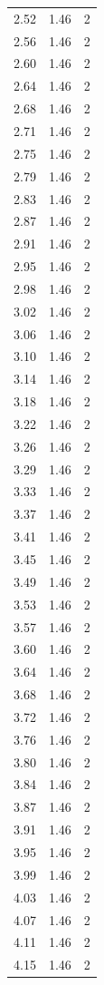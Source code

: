\begin{longtable}{lrr}
  2.52 & 1.46 & 2 \\
  2.56 & 1.46 & 2 \\
  2.60 & 1.46 & 2 \\
  2.64 & 1.46 & 2 \\
  2.68 & 1.46 & 2 \\
  2.71 & 1.46 & 2 \\
  2.75 & 1.46 & 2 \\
  2.79 & 1.46 & 2 \\
  2.83 & 1.46 & 2 \\
  2.87 & 1.46 & 2 \\
  2.91 & 1.46 & 2 \\
  2.95 & 1.46 & 2 \\
  2.98 & 1.46 & 2 \\
  3.02 & 1.46 & 2 \\
  3.06 & 1.46 & 2 \\
  3.10 & 1.46 & 2 \\
  3.14 & 1.46 & 2 \\
  3.18 & 1.46 & 2 \\
  3.22 & 1.46 & 2 \\
  3.26 & 1.46 & 2 \\
  3.29 & 1.46 & 2 \\
  3.33 & 1.46 & 2 \\
  3.37 & 1.46 & 2 \\
  3.41 & 1.46 & 2 \\
  3.45 & 1.46 & 2 \\
  3.49 & 1.46 & 2 \\
  3.53 & 1.46 & 2 \\
  3.57 & 1.46 & 2 \\
  3.60 & 1.46 & 2 \\
  3.64 & 1.46 & 2 \\
  3.68 & 1.46 & 2 \\
  3.72 & 1.46 & 2 \\
  3.76 & 1.46 & 2 \\
  3.80 & 1.46 & 2 \\
  3.84 & 1.46 & 2 \\
  3.87 & 1.46 & 2 \\
  3.91 & 1.46 & 2 \\
  3.95 & 1.46 & 2 \\
  3.99 & 1.46 & 2 \\
  4.03 & 1.46 & 2 \\
  4.07 & 1.46 & 2 \\
  4.11 & 1.46 & 2 \\
  4.15 & 1.46 & 2 \\

\end{longtable}
